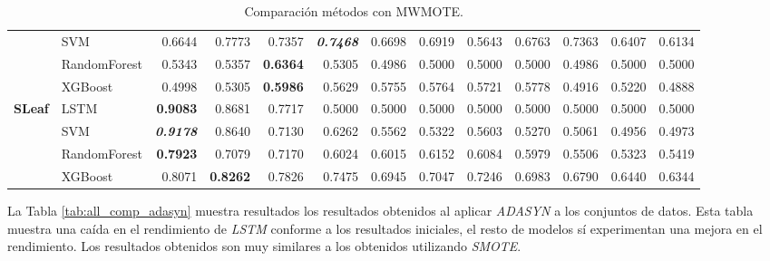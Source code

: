 \begin{table}[H]
\begin{adjustbox}{max width=12cm}
\begin{tabular}{|c|l|r|r|r|r|r|r|r|r|r|r|r|}
			                      & SVM          & 0.6644                   & 0.7773          & 0.7357                   & \textit{\textbf{0.7468}} & 0.6698          & 0.6919                   & 0.5643 & 0.6763 & 0.7363                   & 0.6407          & 0.6134          \\
			                      & RandomForest & 0.5343                   & 0.5357          & \textbf{0.6364}          & 0.5305                   & 0.4986          & 0.5000                   & 0.5000 & 0.5000 & 0.4986                   & 0.5000          & 0.5000          \\
			                      & XGBoost      & 0.4998                   & 0.5305          & \textbf{0.5986}          & 0.5629                   & 0.5755          & 0.5764                   & 0.5721 & 0.5778 & 0.4916                   & 0.5220          & 0.4888          \\
			\hline
			\textbf{SLeaf}        & LSTM         & \textbf{0.9083}          & 0.8681          & 0.7717                   & 0.5000                   & 0.5000          & 0.5000                   & 0.5000 & 0.5000 & 0.5000                   & 0.5000          & 0.5000          \\
			                      & SVM          & \textit{\textbf{0.9178}} & 0.8640          & 0.7130                   & 0.6262                   & 0.5562          & 0.5322                   & 0.5603 & 0.5270 & 0.5061                   & 0.4956          & 0.4973          \\
			                      & RandomForest & \textbf{0.7923}          & 0.7079          & 0.7170                   & 0.6024                   & 0.6015          & 0.6152                   & 0.6084 & 0.5979 & 0.5506                   & 0.5323          & 0.5419          \\
			                      & XGBoost      & 0.8071                   & \textbf{0.8262} & 0.7826                   & 0.7475                   & 0.6945          & 0.7047                   & 0.7246 & 0.6983 & 0.6790                   & 0.6440          & 0.6344          \\
			\hline
		\end{tabular}
	\end{adjustbox}
	\caption{Comparación métodos con MWMOTE.}
	\label{tab:all_comp_mwmote}
\end{table}

La Tabla \ref{tab:all_comp_adasyn} muestra resultados los resultados obtenidos al aplicar \textit{ADASYN} a los conjuntos de datos. Esta tabla muestra una caída en el rendimiento de \textit{LSTM} conforme a los resultados iniciales, el resto de modelos sí experimentan una mejora en el rendimiento. Los resultados obtenidos son muy similares a los obtenidos utilizando \textit{SMOTE}.\newline

